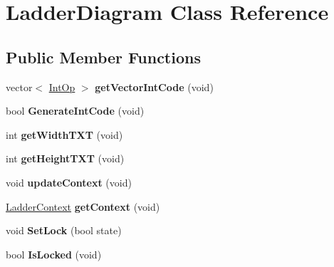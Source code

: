 \hypertarget{class_ladder_diagram}{\section{Ladder\-Diagram Class Reference}
\label{class_ladder_diagram}
}
\subsection*{Public Member Functions}
\begin{DoxyCompactItemize}
\item 
\hypertarget{class_ladder_diagram_a5fac4c72b92f88e399226150aeba7c4e}{vector$<$ \hyperlink{struct_int_op_tag}{Int\-Op} $>$ {\bfseries get\-Vector\-Int\-Code} (void)}\label{class_ladder_diagram_a5fac4c72b92f88e399226150aeba7c4e}

\item 
\hypertarget{class_ladder_diagram_aa522b49a8548d31a97dd18813b00e54b}{bool {\bfseries Generate\-Int\-Code} (void)}\label{class_ladder_diagram_aa522b49a8548d31a97dd18813b00e54b}

\item 
\hypertarget{class_ladder_diagram_a1281eb6c4bd87936cdefd86aecbc869d}{int {\bfseries get\-Width\-T\-X\-T} (void)}\label{class_ladder_diagram_a1281eb6c4bd87936cdefd86aecbc869d}

\item 
\hypertarget{class_ladder_diagram_a17407fd1ac1bb69ed5ab426fb6289980}{int {\bfseries get\-Height\-T\-X\-T} (void)}\label{class_ladder_diagram_a17407fd1ac1bb69ed5ab426fb6289980}

\item 
\hypertarget{class_ladder_diagram_a1a54340c170a5b822704a306221b1b1b}{void {\bfseries update\-Context} (void)}\label{class_ladder_diagram_a1a54340c170a5b822704a306221b1b1b}

\item 
\hypertarget{class_ladder_diagram_acb86456fc1b93d7c9cbf6afab7055d1f}{\hyperlink{struct_ladder_context}{Ladder\-Context} {\bfseries get\-Context} (void)}\label{class_ladder_diagram_acb86456fc1b93d7c9cbf6afab7055d1f}

\item 
\hypertarget{class_ladder_diagram_af7adb162cbe87b329fc3b9d3f6d92632}{void {\bfseries Set\-Lock} (bool state)}\label{class_ladder_diagram_af7adb162cbe87b329fc3b9d3f6d92632}

\item 
\hypertarget{class_ladder_diagram_a74612b5a74cb7f21463c5fb789a07ada}{bool {\bfseries Is\-Locked} (void)}\label{class_ladder_diagram_a74612b5a74cb7f21463c5fb789a07ada}


\end{DoxyCompactItemize}
